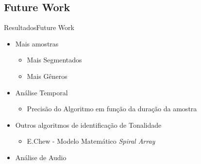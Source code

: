 \subsection{Future Work}
\begin{frame}{Resultados}{Future Work}
    \begin{itemize}
        \item Mais amostras
        \begin{itemize}
            \item Mais Segmentados
            \item Mais Gêneros
        \end{itemize}
        \item Análise Temporal
        \begin{itemize}
            \item Precisão do Algoritmo em função da duração da amostra
        \end{itemize}
        \item Outros algoritmos de identificação de Tonalidade
        \begin{itemize}
            \item E.Chew - Modelo Matemático \textit{Spiral Array}
        \end{itemize}
        \item Análise de Audio
    \end{itemize}
\end{frame}
